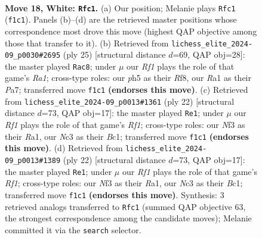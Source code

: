 \documentclass[11pt]{article}
\begin{document}
\clearpage

\begin{figure}[p]\centering
\begin{subfigure}{0.46\textwidth}\centering
\resizebox{\linewidth}{!}{%
\newchessgame
\chessboard[
  setfen={2b2rk1/r3qpp1/np1p1n2/4p2p/P3P3/2NB1N2/2PQ1PPP/R4RK1 w - - 0 18},
  showmover=false,
  pgfstyle=straightmove, color=movearrow, markmove={f1-c1}
]}
\caption{}
\end{subfigure}\hfill
\begin{subfigure}{0.46\textwidth}\centering
\resizebox{\linewidth}{!}{%
\newchessgame
\chessboard[
  setfen={r4rk1/pp1qbppp/5n2/3pn3/3N4/PPN1B2P/2P2PP1/R2Q1RK1 b - - 0 13},
  showmover=false,
  pgfstyle=straightmove, color=movearrow, markmove={a8-c8}
]}
\caption{}
\end{subfigure}
\\[4pt]
\begin{subfigure}{0.46\textwidth}\centering
\resizebox{\linewidth}{!}{%
\newchessgame
\chessboard[
  setfen={r1bq1rk1/p4pp1/2pb1n1p/n3p3/8/2NB1N2/PPPP1PPP/R1BQ1RK1 w - - 2 12},
  showmover=false,
  pgfstyle=straightmove, color=movearrow, markmove={f1-e1}
]}
\caption{}
\end{subfigure}\hfill
\begin{subfigure}{0.46\textwidth}\centering
\resizebox{\linewidth}{!}{%
\newchessgame
\chessboard[
  setfen={r1bq1rk1/p4pp1/2pb1n1p/n3p3/8/2NB1N2/PPPP1PPP/R1BQ1RK1 w - - 2 12},
  showmover=false,
  pgfstyle=straightmove, color=movearrow, markmove={f1-e1}
]}
\caption{}
\end{subfigure}
\caption{\textbf{Move 18, White: \texttt{Rfc1}.} (a) Our position; Melanie plays \texttt{Rfc1} (\texttt{f1c1}). Panels (b)--(d) are the retrieved master positions whose correspondence most drove this move (highest QAP objective among those that transfer to it). (b) Retrieved from \texttt{lichess\_elite\_2024-09\_p0030\#2695} (ply 25) [structural distance $d$=69, QAP obj=28]: the master played \texttt{Rac8}; under $\mu$ our \emph{Rf1} plays the role of that game's \emph{Ra1}; cross-type roles: our \emph{p}h5 as their \emph{R}f8, our \emph{R}a1 as their \emph{P}a7; transferred move \texttt{f1c1} \textbf{(endorses this move)}. (c) Retrieved from \texttt{lichess\_elite\_2024-09\_p0013\#1361} (ply 22) [structural distance $d$=73, QAP obj=17]: the master played \texttt{Re1}; under $\mu$ our \emph{Rf1} plays the role of that game's \emph{Rf1}; cross-type roles: our \emph{N}f3 as their \emph{R}a1, our \emph{N}c3 as their \emph{B}c1; transferred move \texttt{f1c1} \textbf{(endorses this move)}. (d) Retrieved from \texttt{lichess\_elite\_2024-09\_p0013\#1389} (ply 22) [structural distance $d$=73, QAP obj=17]: the master played \texttt{Re1}; under $\mu$ our \emph{Rf1} plays the role of that game's \emph{Rf1}; cross-type roles: our \emph{N}f3 as their \emph{R}a1, our \emph{N}c3 as their \emph{B}c1; transferred move \texttt{f1c1} \textbf{(endorses this move)}. Synthesis: 3 retrieved analogs transferred to \texttt{Rfc1} (summed QAP objective 63, the strongest correspondence among the candidate moves); Melanie committed it via the \texttt{search} selector.}
\label{fig:thought-m34}
\end{figure}
\end{document}
